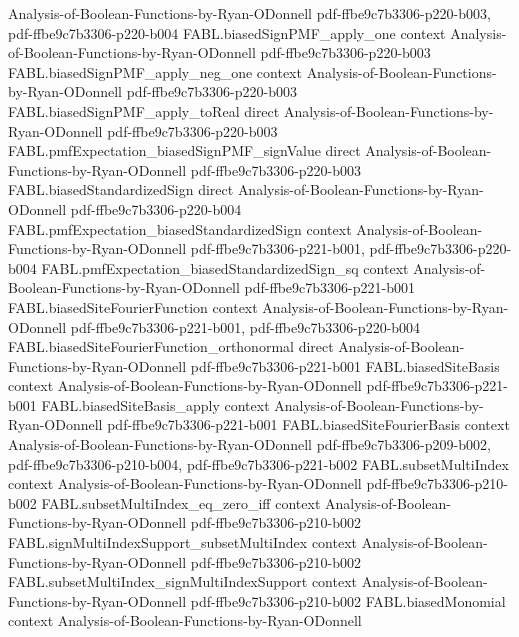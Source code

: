 \begin{theorem}
  {Analysis-of-Boolean-Functions-by-Ryan-ODonnell}
  {pdf-ffbe9c7b3306-p220-b003,
    pdf-ffbe9c7b3306-p220-b004}
\proofstep
  {FABL.biasedSignPMF_apply_one}
  {context}
  {Analysis-of-Boolean-Functions-by-Ryan-ODonnell}
  {pdf-ffbe9c7b3306-p220-b003}
\proofstep
  {FABL.biasedSignPMF_apply_neg_one}
  {context}
  {Analysis-of-Boolean-Functions-by-Ryan-ODonnell}
  {pdf-ffbe9c7b3306-p220-b003}
\proofstep
  {FABL.biasedSignPMF_apply_toReal}
  {direct}
  {Analysis-of-Boolean-Functions-by-Ryan-ODonnell}
  {pdf-ffbe9c7b3306-p220-b003}
\proofstep
  {FABL.pmfExpectation_biasedSignPMF_signValue}
  {direct}
  {Analysis-of-Boolean-Functions-by-Ryan-ODonnell}
  {pdf-ffbe9c7b3306-p220-b003}
\proofstep
  {FABL.biasedStandardizedSign}
  {direct}
  {Analysis-of-Boolean-Functions-by-Ryan-ODonnell}
  {pdf-ffbe9c7b3306-p220-b004}
\proofstep
  {FABL.pmfExpectation_biasedStandardizedSign}
  {context}
  {Analysis-of-Boolean-Functions-by-Ryan-ODonnell}
  {pdf-ffbe9c7b3306-p221-b001,
    pdf-ffbe9c7b3306-p220-b004}
\proofstep
  {FABL.pmfExpectation_biasedStandardizedSign_sq}
  {context}
  {Analysis-of-Boolean-Functions-by-Ryan-ODonnell}
  {pdf-ffbe9c7b3306-p221-b001}
\proofstep
  {FABL.biasedSiteFourierFunction}
  {context}
  {Analysis-of-Boolean-Functions-by-Ryan-ODonnell}
  {pdf-ffbe9c7b3306-p221-b001,
    pdf-ffbe9c7b3306-p220-b004}
\proofstep
  {FABL.biasedSiteFourierFunction_orthonormal}
  {direct}
  {Analysis-of-Boolean-Functions-by-Ryan-ODonnell}
  {pdf-ffbe9c7b3306-p221-b001}
\proofstep
  {FABL.biasedSiteBasis}
  {context}
  {Analysis-of-Boolean-Functions-by-Ryan-ODonnell}
  {pdf-ffbe9c7b3306-p221-b001}
\proofstep
  {FABL.biasedSiteBasis_apply}
  {context}
  {Analysis-of-Boolean-Functions-by-Ryan-ODonnell}
  {pdf-ffbe9c7b3306-p221-b001}
\proofstep
  {FABL.biasedSiteFourierBasis}
  {context}
  {Analysis-of-Boolean-Functions-by-Ryan-ODonnell}
  {pdf-ffbe9c7b3306-p209-b002,
    pdf-ffbe9c7b3306-p210-b004,
    pdf-ffbe9c7b3306-p221-b002}
\proofstep
  {FABL.subsetMultiIndex}
  {context}
  {Analysis-of-Boolean-Functions-by-Ryan-ODonnell}
  {pdf-ffbe9c7b3306-p210-b002}
\proofstep
  {FABL.subsetMultiIndex_eq_zero_iff}
  {context}
  {Analysis-of-Boolean-Functions-by-Ryan-ODonnell}
  {pdf-ffbe9c7b3306-p210-b002}
\proofstep
  {FABL.signMultiIndexSupport_subsetMultiIndex}
  {context}
  {Analysis-of-Boolean-Functions-by-Ryan-ODonnell}
  {pdf-ffbe9c7b3306-p210-b002}
\proofstep
  {FABL.subsetMultiIndex_signMultiIndexSupport}
  {context}
  {Analysis-of-Boolean-Functions-by-Ryan-ODonnell}
  {pdf-ffbe9c7b3306-p210-b002}
\proofstep
  {FABL.biasedMonomial}
  {context}
  {Analysis-of-Boolean-Functions-by-Ryan-ODonnell}

\end{theorem}

